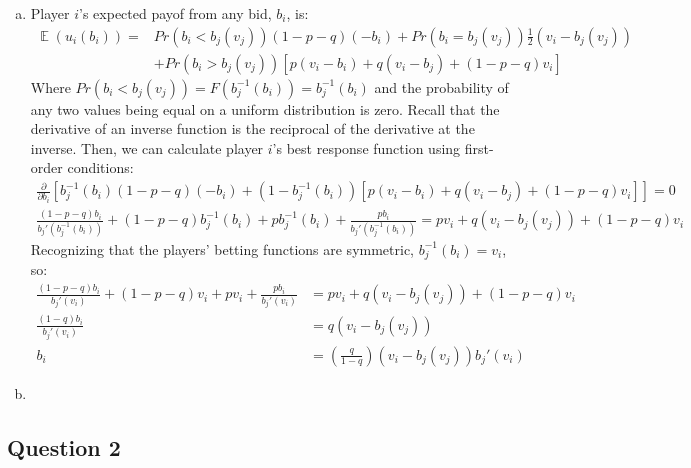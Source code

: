 \documentclass{article}
\newcommand{\binv}[1]{b_j^{-1}\left(#1\right)}
\DeclareMathOperator{\E}{\mathbb{E}}%
\begin{document}
\begin{enumerate}[(a)]
	
	\item Player $i$'s expected payof from any bid, $b_i$, is:
		\begin{align*}
			\E(u_i(b_i)) = &Pr(b_i<b_j(v_j))(1-p-q)(-b_i) +  Pr(b_i=b_j(v_j))\frac{1}{2}(v_i-b_j(v_j)) \\
							&+  Pr(b_i>b_j(v_j))[p(v_i-b_i) + q(v_i-b_j) + (1-p-q)v_i]
		\end{align*}
		Where $Pr(b_i<b_j(v_j))=F(\binv{b_i})=\binv{b_i}$ and the probability of any two values being equal on a uniform distribution is zero. Recall that the derivative of an inverse function is the reciprocal of the derivative at the inverse. Then, we can calculate player $i$'s best response function using first-order conditions:
		\begin{align*}
			\frac{\partial}{\partial b_i}\left[\binv{b_i}(1-p-q)(-b_i) + \left(1-\binv{b_i}\right)[p(v_i-b_i) + q(v_i-b_j) + (1-p-q)v_i]\right] = 0	\\
			\frac{(1-p-q)b_i}{b_j'\left(\binv{b_i}\right)} + (1-p-q)\binv{b_i} + p\binv{b_i} + \frac{pb_i}{b_j'\left(\binv{b_i}\right)} = pv_i + q(v_i-b_j(v_j)) + (1-p-q)v_i
		\end{align*}
		Recognizing that the players' betting functions are symmetric, ${\binv{b_i}=v_i}$, so:
		\begin{align*}
			\frac{(1-p-q)b_i}{b_j'(v_i)} + (1-p-q)v_i + pv_i+ \frac{pb_i}{b_j'(v_i)} &= pv_i + q(v_i-b_j(v_j)) + (1-p-q)v_i	\\
			\frac{(1-q)b_i}{b_j'(v_i)} &= q(v_i - b_j(v_j))	\\
			b_i	&= \left(\frac{q}{1-q}\right)(v_i - b_j(v_j))b_j'(v_i)
		\end{align*}
	
	\item 
	
	
\end{enumerate}




\subsection*{Question 2}
\end{document}
